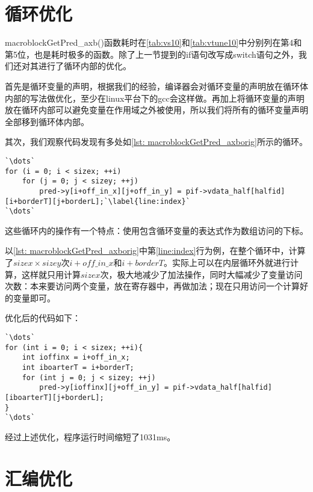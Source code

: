 \section{循环优化}
\label{sec:singlecoreloopopt}

macroblockGetPred\_axb()函数耗时在\autoref{tab:vs10}和\autoref{tab:vtune10}中分别列在第4和第5位，也是耗时极多的函数。除了上一节提到的if语句改写成switch语句之外，我们还对其进行了循环内部的优化。

首先是循环变量的声明，根据我们的经验，编译器会对循环变量的声明放在循环体内部的写法做优化，至少在linux平台下的gcc会这样做。再加上将循环变量的声明放在循环内部可以避免变量在作用域之外被使用，所以我们将所有的循环变量声明全部移到循环体内部。

其次，我们观察代码发现有多处如\autoref{lst: macroblockGetPred_axborig}所示的循环。

\begin{lstlisting}[caption = {macroblockGetPred\_axb()函数片段（优化前）}, label = lst: macroblockGetPred_axborig]
`\dots`
for (i = 0; i < sizex; ++i)
	for (j = 0; j < sizey; ++j)
		pred->y[i+off_in_x][j+off_in_y] = pif->vdata_half[halfid][i+borderT][j+borderL];`\label{line:index}`
`\dots`
\end{lstlisting}

这些循环内的操作有一个特点：使用包含循环变量的表达式作为数组访问的下标。

以\autoref{lst: macroblockGetPred_axborig}中第\ref{line:index}行为例，在整个循环中，计算了$sizex\times sizey$次$i+off\_in\_x$和$i+borderT$。实际上可以在内层循环外就进行计算，这样就只用计算$sizex$次，极大地减少了加法操作，同时大幅减少了变量访问次数：本来要访问两个变量，放在寄存器中，再做加法；现在只用访问一个计算好的变量即可。

优化后的代码如下：
\begin{lstlisting}[caption = {macroblockGetPred\_axb()函数片段（优化后）}, label = lst: macroblockGetPred_axbopt]
`\dots`
for (int i = 0; i < sizex; ++i){
	int ioffinx = i+off_in_x;
	int iboarterT = i+borderT;
	for (int j = 0; j < sizey; ++j)
		pred->y[ioffinx][j+off_in_y] = pif->vdata_half[halfid][iboarterT][j+borderL];
}
`\dots`
\end{lstlisting}

经过上述优化，程序运行时间缩短了1031ms。


\section{汇编优化}
\label{sec:singlecoreasmopt}

